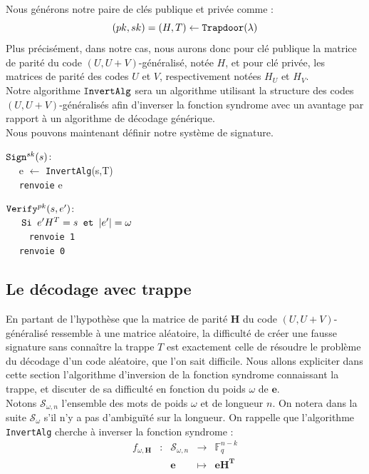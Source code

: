 \documentclass[12pt]{article}
\theoremstyle{plain}
\theoremstyle{definition}
\newcommand{\F}{\mathbb{F}}
\newcommand{\e}{\mathbf{e}}
\begin{document}
\noindent Nous générons notre paire de clés publique et privée comme :
$$ (pk, sk) = (H,T) \leftarrow \verb|Trapdoor|(\lambda)$$
Plus précisément, dans notre cas, nous aurons donc pour clé publique la matrice de parité du code $(U,U+V)$-généralisé, notée $H$, et pour clé privée, les matrices de parité des codes $U$ et $V$, respectivement notées $H_U$ et $H_V$.\\
Notre algorithme $\verb|InvertAlg|$ sera un algorithme utilisant la structure des codes  $(U,U+V)$-généralisés afin d'inverser la fonction syndrome avec un avantage par rapport à un algorithme de décodage générique. \\
Nous pouvons maintenant définir notre système de signature.
\begin{multicols}{2}
\begin{flushleft}
$\verb|Sign|^{sk}(s)$:\\
	$\quad$ e $\leftarrow$  \verb|InvertAlg|(s,T) \\
	$\quad$ \verb|renvoie| e
\end{flushleft}
\begin{flushleft}
$\verb|Verify|^{pk}(s,e')$: \\
	$\quad \verb| Si | e'H^T = s \verb| et | |e'| = \omega $ \\
	$\quad \quad$ \verb|renvoie 1| \\
	$\quad$ \verb|renvoie 0|
\end{flushleft}
\end{multicols}


\subsection{Le décodage avec trappe}

En partant de l'hypothèse que la matrice de parité $\mathbf{H}$ du code $(U,U+V)$-généralisé ressemble à une matrice aléatoire, la difficulté de créer une fausse signature sans connaître la trappe $T$ est exactement celle de résoudre le problème du décodage d'un code aléatoire, que l'on sait difficile. Nous allons expliciter dans cette section l'algorithme d'inversion de la fonction syndrome connaissant la trappe, et discuter de sa difficulté en fonction du poids $\omega$ de $\e$. \\

\noindent Notons $\mathcal{S}_{\omega,n}$ l'ensemble des mots de poids $\omega$ et de longueur $n$. On notera dans la suite $\mathcal{S}_{\omega}$ s'il n'y a pas d’ambiguïté sur la longueur. On rappelle que l'algorithme \verb|InvertAlg| cherche à inverser la fonction syndrome : 
$$\begin{array}{ccccc}
f_{\omega,\mathbf{H}} & : & \mathcal{S}_{\omega,n} & \to & \F_q^{n-k} \\
 & & \mathbf{e} & \mapsto & \mathbf{eH^T} \\
\end{array}$$
\end{document}
